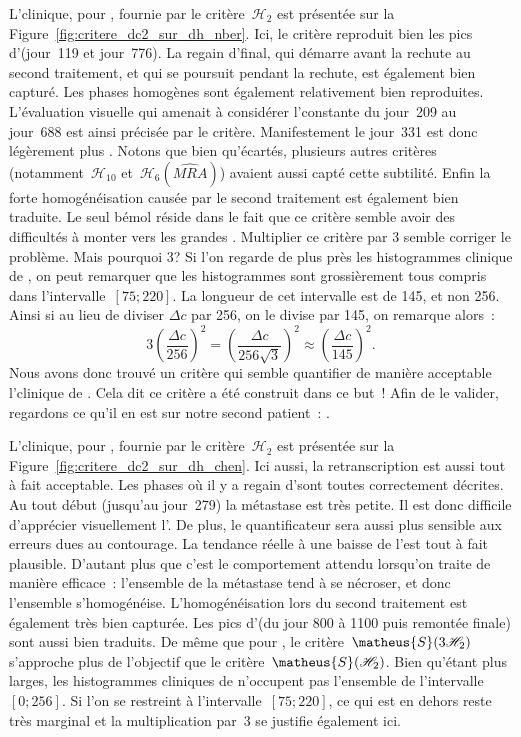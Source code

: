 \documentclass[main.tex]{subfiles}
\begin{document}
L'\hetero clinique, pour \Nber, fournie par le critère~$\mathcal{H}_{2}$ est présentée sur la Figure~\ref{fig:critere_dc2_sur_dh_nber}. Ici, le critère reproduit bien les pics d'\heteros (jour~119 et jour~776). La regain d'\hetero final, qui démarre avant la rechute au second traitement, et qui se poursuit pendant la rechute, est également bien capturé. Les phases homogènes sont également relativement bien reproduites. L'évaluation visuelle qui amenait à considérer l'\hetero constante du jour~209 au jour~688 est ainsi précisée par le critère. Manifestement le jour~331 est donc légèrement plus \heterogene. Notons que bien qu'écartés, plusieurs autres critères (notamment~$\mathcal{H}_{10}$ et~$\mathcal{H}_6(\widehat{MRA})$) 
avaient aussi capté cette subtilité. Enfin la forte homogénéisation causée par le second traitement est également bien traduite. 
Le seul bémol réside dans le fait que ce critère semble avoir des difficultés à monter vers les grandes \hetero. Multiplier ce critère par 3 semble corriger le problème. Mais pourquoi 3? 
Si l'on regarde de plus près les histogrammes clinique de \Nber, on peut remarquer que les histogrammes sont grossièrement tous compris dans l'intervalle~$[75;220]$. La longueur de cet intervalle est de 145, et non 256. Ainsi si au lieu de diviser $\Delta c$ par 256, on le divise par 145, on remarque alors~:
\begin{equation}
3 \left(\frac{\Delta c}{256}\right)^2 = \left(\frac{\Delta c}{256\sqrt{3}}\right)^2 \approx \left(\frac{\Delta c}{145}\right)^2.
\end{equation}
Nous avons donc trouvé un critère qui semble quantifier de manière acceptable l'\hetero clinique de \Nber. Cela dit ce critère a été construit dans ce but~! Afin de le valider, regardons ce qu'il en est sur notre second patient~: \Chen.


L'\hetero clinique, pour \Chen, fournie par le critère~$\mathcal{H}_{2}$ est présentée sur la Figure~\ref{fig:critere_dc2_sur_dh_chen}. Ici aussi, la retranscription est aussi tout à fait acceptable. Les phases où il y a regain d'\hetero sont toutes correctement décrites. Au tout début (jusqu'au jour~279) la métastase est très petite. Il est donc difficile d'apprécier visuellement l'\hetero. De plus, le quantificateur sera aussi plus sensible aux erreurs dues au contourage. La tendance réelle à une baisse de l'\hetero est tout à fait plausible. D'autant plus que c'est le comportement attendu lorsqu'on traite de manière efficace~: l'ensemble de la métastase tend à se nécroser, et donc l'ensemble s'homogénéise.
L'homogénéisation lors du second traitement est également très bien capturée. 
Les pics d'\hetero (du jour 800 à 1100 puis remontée finale) sont aussi bien traduits. De même que pour \Nber, le critère~$\matheus{S}(3\mathscr{H}_2)$ s'approche plus de l'objectif que le critère~$\matheus{S}(\mathscr{H}_2)$. 
Bien qu'étant plus larges, les histogrammes cliniques de \Chen n'occupent pas l'ensemble de l'intervalle~$[0;256]$. Si l'on se restreint à l'intervalle~$[75;220]$, ce qui est en dehors reste très marginal et la multiplication par~3 se justifie également ici. 
\end{document}
